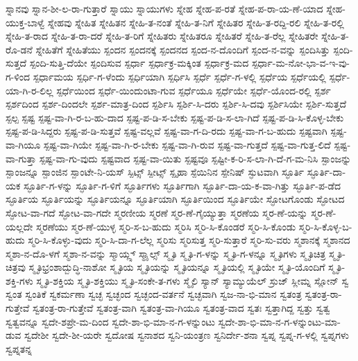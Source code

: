 {ಸ್ನಾನವು
ಸ್ನಾನ-ಶೀ-ಲ-ರಾ-ಗುತ್ತಾರೆ
ಸ್ನಾಯು
ಸ್ನಾಯುಗಳು
ಸ್ನೇಹ
ಸ್ನೇಹ-ಪ-ರತೆ
ಸ್ನೇಹ-ಪ-ರಾ-ಯ-ಣೆ-ಯಾದ
ಸ್ನೇಹ-ಯುಕ್ತ-ಬಾಳ್ವೆ
ಸ್ನೇಹವು
ಸ್ನೇಹಿತ
ಸ್ನೇಹಿತನ
ಸ್ನೇಹಿ-ತ-ನಂತೆ
ಸ್ನೇಹಿ-ತ-ನಿಗೆ
ಸ್ನೇಹಿತರ
ಸ್ನೇಹಿ-ತ-ರದ್ದಿ-ರಲಿ
ಸ್ನೇಹಿ-ತ-ರಲ್ಲಿ
ಸ್ನೇಹಿ-ತ-ರಾದ
ಸ್ನೇಹಿ-ತ-ರಾ-ದರೆ
ಸ್ನೇಹಿ-ತ-ರಿಗೆ
ಸ್ನೇಹಿತರು
ಸ್ನೇಹಿತರೂ
ಸ್ನೇಹಿತರೆ
ಸ್ನೇಹಿ-ತ-ರೆಲ್ಲ
ಸ್ನೇಹಿತರೇ
ಸ್ನೇಹಿ-ತ-ರೊ-ಡನೆ
ಸ್ನೇಹಿತೆಗೆ
ಸ್ನೇಹಿತೆಯು
ಸ್ಪಂದನ
ಸ್ಪಂದನಕ್ಕೆ
ಸ್ಪಂದನದ
ಸ್ಪಂದ-ನ-ದೊಂದಿಗೆ
ಸ್ಪಂದ-ನ-ವನ್ನು
ಸ್ಪಂದಿಸಿತ್ತು
ಸ್ಪಂದಿ-ಸುತ್ತದೆ
ಸ್ಪಂದಿ-ಸುತ್ತಿ-ದೆಯೇ
ಸ್ಪಂದಿಸುವ
ಸ್ಪರ್ಧಾ
ಸ್ಪರ್ಧಾಕ್ರ-ಮಕ್ಕಿಂತ
ಸ್ಪರ್ಧಾಕ್ರ-ಮದ
ಸ್ಪರ್ಧಾ-ಮ-ನೋ-ಭಾ-ವ-ಇ-ವು-ಗ-ಳಿಂದ
ಸ್ಪರ್ಧಾಮಯ
ಸ್ಪರ್ಧಿ-ಗ-ಳೆಂದು
ಸ್ಪರ್ಧಿಯಾಗಿ
ಸ್ಪರ್ಧಿಸಿ
ಸ್ಪರ್ಧೆ
ಸ್ಪರ್ಧೆ-ಗ-ಳಲ್ಲಿ
ಸ್ಪರ್ಧೆಯ
ಸ್ಪರ್ಧೆಯಲ್ಲಿ
ಸ್ಪರ್ಧೆ-ಯಾ-ಗಿ-ರ-ಲಿಲ್ಲ
ಸ್ಪರ್ಧೆಯಿಂದ
ಸ್ಪರ್ಧೆ-ಯಿಂದುಂಟಾ-ಗುವ
ಸ್ಪರ್ಧೆಯೂ
ಸ್ಪರ್ಧೆಯೇ
ಸ್ಪರ್ಧೆ-ಯೊಂದ-ರಲ್ಲಿ
ಸ್ಪರ್ಶ
ಸ್ಪರ್ಶದಿಂದ
ಸ್ಪರ್ಶ-ದಿಂದಲೇ
ಸ್ಪರ್ಶ-ಮಾತ್ರ-ದಿಂದ
ಸ್ಪರ್ಶಿಸಿ
ಸ್ಪರ್ಶಿ-ಸಿ-ದರು
ಸ್ಪರ್ಶಿ-ಸಿ-ದವು
ಸ್ಪರ್ಶಿಸಿಯೇ
ಸ್ಪರ್ಶಿ-ಸುತ್ತದೆ
ಸ್ಪಲ್ಪ
ಸ್ಪಷ್ಟ
ಸ್ಪಷ್ಟ-ವಾ-ಗಿ-ರ-ಬ-ಹು-ದಾದ
ಸ್ಪಷ್ಟ-ಪ-ಡಿ-ಸ-ಬೇಕು
ಸ್ಪಷ್ಟ-ಪ-ಡಿ-ಸ-ಲಾ-ಗಿದೆ
ಸ್ಪಷ್ಟ-ಪ-ಡಿ-ಸಿ-ಕೊಳ್ಳ-ಬೇಕು
ಸ್ಪಷ್ಟ-ಪ-ಡಿ-ಸಿದ್ದರು
ಸ್ಪಷ್ಟ-ಪ-ಡಿ-ಸುತ್ತವೆ
ಸ್ಪಷ್ಟ-ವಲ್ಲವೆ
ಸ್ಪಷ್ಟ-ವಾ-ಗ-ದಿ-ರದು
ಸ್ಪಷ್ಟ-ವಾ-ಗ-ಬ-ಹುದು
ಸ್ಪಷ್ಟವಾಗಿ
ಸ್ಪಷ್ಟ-ವಾ-ಗಿಯೂ
ಸ್ಪಷ್ಟ-ವಾ-ಗಿಯೇ
ಸ್ಪಷ್ಟ-ವಾ-ಗಿ-ರ-ಬೇಕು
ಸ್ಪಷ್ಟ-ವಾ-ಗಿ-ರುವ
ಸ್ಪಷ್ಟ-ವಾ-ಗುತ್ತದೆ
ಸ್ಪಷ್ಟ-ವಾ-ಗುತ್ತ-ಲಿದೆ
ಸ್ಪಷ್ಟ-ವಾ-ಗುತ್ತಾ
ಸ್ಪಷ್ಟ-ವಾ-ಗು-ವುದು
ಸ್ಪಷ್ಟವಾದ
ಸ್ಪಷ್ಟ-ವಾ-ಯಿತು
ಸ್ಪಷ್ಟವೂ
ಸ್ಪಷ್ಟೀ-ಕ-ರಿ-ಸ-ಲಾ-ಗಿ-ದೆ-ಗ-ಮ-ನಿಸಿ
ಸ್ಪಾಂಜನ್ನು
ಸ್ಪಾಂಜನ್ನೂ
ಸ್ಪಾಂಜಿನ
ಸ್ಪಾಂಟೇ-ನಿ-ಯಸ್
ಸ್ಪಿಟ್ಸ್
ಸ್ಪೀಟ್ಸ್
ಸ್ಪೃಹಾ
ಸ್ಪೆಯಿನಿನ
ಸ್ಪೇನಿಷ್
ಸ್ಫುಟವಾಗಿ
ಸ್ಫೂರ್ತಿ
ಸ್ಫೂರ್ತಿ-ದಾ-ಯಕ
ಸ್ಫೂರ್ತಿ-ಗ-ಳನ್ನು
ಸ್ಫೂರ್ತಿ-ಗ-ಳಿಗೆ
ಸ್ಫೂರ್ತಿಗಳು
ಸ್ಫೂರ್ತಿಗಾಗಿ
ಸ್ಫೂರ್ತಿ-ದಾ-ಯ-ಕ-ವಾ-ಗಿತ್ತು
ಸ್ಫೂರ್ತಿ-ಪ-ಡೆದ
ಸ್ಫೂರ್ತಿಯ
ಸ್ಫೂರ್ತಿಯನ್ನು
ಸ್ಫೂರ್ತಿಯನ್ನೂ
ಸ್ಫೂರ್ತಿಯಾಗಿ
ಸ್ಫೂರ್ತಿಯಿಂದ
ಸ್ಫೂರ್ತಿಯೇ
ಸ್ಫೋಟಗೊಂಡು
ಸ್ಫೋಟದ
ಸ್ಫೋಟ-ವಾ-ಗದೆ
ಸ್ಫೋಟ-ವಾ-ಗದೇ
ಸ್ಮರಣೀಯ
ಸ್ಮರಣೆ
ಸ್ಮರ-ಣೆ-ಗೈಯ್ಯುತ್ತಾ
ಸ್ಮರಣೆಯ
ಸ್ಮರ-ಣೆ-ಯನ್ನು
ಸ್ಮರ-ಣೆ-ಯಲ್ಲದೇ
ಸ್ಮರಣೆಯು
ಸ್ಮರ-ಣೆ-ಯುಳ್ಳ
ಸ್ಮರಿ-ಸ-ಬ-ಹುದು
ಸ್ಮರಿಸಿ
ಸ್ಮರಿ-ಸಿ-ಕೊಂಡರೆ
ಸ್ಮರಿ-ಸಿ-ಕೊಂಡು
ಸ್ಮರಿ-ಸಿ-ಕೊಳ್ಳ-ಬ-ಹುದು
ಸ್ಮರಿ-ಸಿ-ಕೊಳ್ಳು-ವುದು
ಸ್ಮರಿ-ಸಿ-ದಾ-ಗ-ಲೆಲ್ಲ
ಸ್ಮರಿಸು
ಸ್ಮರಿಸುತ್ತ
ಸ್ಮರಿ-ಸುತ್ತಾರೆ
ಸ್ಮರಿ-ಸು-ವರು
ಸ್ಮಶಾನಕ್ಕೆ
ಸ್ಮಶಾನದ
ಸ್ಮಶಾ-ನ-ದೊ-ಳಗೆ
ಸ್ಮಶಾ-ನ-ವನ್ನು
ಸ್ಮಾಯ್ಲ್ಸ್
ಸ್ಮಾೖಲ್ಸ್
ಸ್ಮೃತಿ
ಸ್ಮೃತಿ-ಗ-ಳನ್ನು
ಸ್ಮೃತಿ-ಗ-ಳನ್ನೂ
ಸ್ಮೃತಿಗಳು
ಸ್ಮೃತಿಚಿತ್ರ
ಸ್ಮೃತಿ-ಚಿತ್ರವು
ಸ್ಮೃತಿಭ್ರಂಶಾದ್ಬುದ್ಧಿ-ನಾಶೋ
ಸ್ಮೃತಿಯ
ಸ್ಮೃತಿಯನ್ನು
ಸ್ಮೃತಿಯನ್ನೂ
ಸ್ಮೃತಿಯಲ್ಲಿ
ಸ್ಮೃತಿಯೇ
ಸ್ಮೃತಿ-ಯೊಂದಿಗೆ
ಸ್ಮೃತಿ-ಶಕ್ತಿ-ಗಳು
ಸ್ಮೃತಿ-ಶಕ್ತಿಯ
ಸ್ಮೃತಿ-ಶಕ್ತಿಯು
ಸ್ಮೃತಿ-ಸಂಕೇ-ತ-ಗಳು
ಸ್ಮೈಲಿ
ಸ್ಯಾನ್
ಸ್ಯಾಮ್ಯುಯೆಲ್
ಸ್ರುಜ್
ಸ್ಲೀಮ್ನ
ಸ್ಲೋನ್
ಸ್ವ
ಸ್ವಂತ
ಸ್ವಂತಿಕೆ
ಸ್ವಕರ್ಮಣಾ
ಸ್ವಚ್ಛ
ಸ್ವಚ್ಛಂದ
ಸ್ವಚ್ಛಂದ-ವರ್ತನೆ
ಸ್ವಚ್ಛವಾಗಿ
ಸ್ವಜ-ನಾ-ಭಿ-ಮಾನ
ಸ್ವತಂತ್ರ
ಸ್ವತಂತ್ರ-ರಾ-ಗುತ್ತೇವೆ
ಸ್ವತಂತ್ರ-ರಾ-ಗುತ್ತೇವೆ
ಸ್ವತಂತ್ರ-ವಾಗಿ
ಸ್ವತಂತ್ರ-ವಾ-ಗಿಯೂ
ಸ್ವತಂತ್ರ-ವಾದ
ಸ್ವತಃ
ಸ್ವತ್ತಾಗಿದ್ದ
ಸ್ವತ್ತು
ಸ್ವತ್ವ
ಸ್ವತ್ವವನ್ನೂ
ಸ್ವದೇ-ಶಪ್ರೇ-ಮ-ದಿಂದ
ಸ್ವದೇ-ಶಾ-ಭಿ-ಮಾ-ನ-ಗ-ಳನ್ನುಂಟು
ಸ್ವದೇ-ಶಾ-ಭಿ-ಮಾ-ನ-ಗ-ಳನ್ನುಂಟು-ಮಾ-ಡುವ
ಸ್ವದೇಶೀ
ಸ್ವದೇ-ಶೀ-ಯರೇ
ಸ್ವದೋಷ
ಸ್ವನಾಶದ
ಸ್ವನಿ-ಯಂತ್ರಣ
ಸ್ವನಿರ್ದೇ-ಶನಾ
ಸ್ವಪ್ನ
ಸ್ವಪ್ನ-ಗ-ಳಲ್ಲಿ
ಸ್ವಪ್ನಗಳು
ಸ್ವಪ್ನತನ್ನ
}
